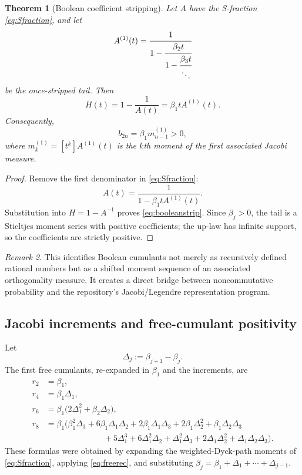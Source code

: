 \documentclass[11pt,oneside]{article}
\newtheorem{theorem}{Theorem}[section]
\theoremstyle{definition}
\theoremstyle{remark}
\newtheorem{remark}[theorem]{Remark}
\begin{document}
\begin{theorem}[Boolean coefficient stripping]\label{thm:booleanstrip}
Let \(A\) have the S-fraction \eqref{eq:Sfraction}, and let
\[
A^{(1)}(t)=
\cfrac{1}{1-\cfrac{\beta_2t}{1-\cfrac{\beta_3t}{\ddots}}}
\]
be the once-stripped tail. Then
\begin{equation}\label{eq:booleanstrip}
H(t)=1-\frac1{A(t)}=\beta_1tA^{(1)}(t).
\end{equation}
Consequently,
\begin{equation}\label{eq:booleanassociated}
b_{2n}=\beta_1m_{n-1}^{(1)}>0,
\end{equation}
where \(m_k^{(1)}=[t^k]A^{(1)}(t)\) is the \(k\)th moment of the first associated Jacobi measure.
\end{theorem}
\begin{proof}
Remove the first denominator in \eqref{eq:Sfraction}:
\[
A(t)=\frac1{1-\beta_1tA^{(1)}(t)}.
\]
Substitution into \(H=1-A^{-1}\) proves \eqref{eq:booleanstrip}. Since \(\beta_j>0\), the tail is a Stieltjes moment series with positive coefficients; the up-law has infinite support, so the coefficients are strictly positive.
\end{proof}

\begin{remark}
This identifies Boolean cumulants not merely as recursively defined rational numbers but as a shifted moment sequence of an associated orthogonality measure. It creates a direct bridge between noncommutative probability and the repository's Jacobi/Legendre representation program.
\end{remark}

\subsection{Jacobi increments and free-cumulant positivity}
Let
\begin{equation}\label{eq:deltabeta}
\Delta_j:=\beta_{j+1}-\beta_j.
\end{equation}
The first free cumulants, re-expanded in \(\beta_1\) and the increments, are
\begin{align}
r_2&=\beta_1,\label{eq:r2beta}\\
r_4&=\beta_1\Delta_1,\label{eq:r4beta}\\
r_6&=\beta_1\bigl(2\Delta_1^2+\beta_2\Delta_2\bigr),\label{eq:r6beta}\\
r_8&=\beta_1\bigl(
\beta_1^2\Delta_3+6\beta_1\Delta_1\Delta_2
+2\beta_1\Delta_1\Delta_3+2\beta_1\Delta_2^2
+\beta_1\Delta_2\Delta_3\nonumber\\
&\hspace{7em}+5\Delta_1^3+6\Delta_1^2\Delta_2
+\Delta_1^2\Delta_3+2\Delta_1\Delta_2^2
+\Delta_1\Delta_2\Delta_3\bigr).
\label{eq:r8beta}
\end{align}
These formulas were obtained by expanding the weighted-Dyck-path moments of \eqref{eq:Sfraction}, applying \eqref{eq:freerec}, and substituting \(\beta_j=\beta_1+\Delta_1+\cdots+\Delta_{j-1}\).
\end{document}

